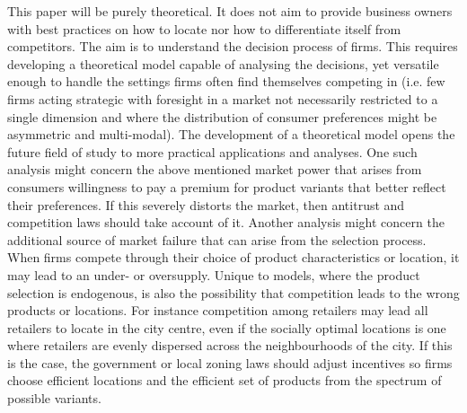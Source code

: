 \documentclass[preprint, 12pt]{elsarticle}
\begin{document}
This paper will be purely theoretical. It does not aim to provide business owners with best practices on how to locate nor how to differentiate itself from competitors. The aim is to understand the decision process of firms. This requires developing a theoretical model capable of analysing the decisions, yet versatile enough to handle the settings firms often find themselves competing in (i.e. few firms acting strategic with foresight in a market not necessarily restricted to a single dimension and where the distribution of consumer preferences might be asymmetric and multi-modal). The development of a theoretical model opens the future field of study to more practical applications and analyses. One such analysis might concern the above mentioned market power that arises from consumers willingness to pay a premium for product variants that better reflect their preferences. If this severely distorts the market, then antitrust and competition laws should take account of it. Another analysis might concern the additional source of market failure that can arise from the selection process. When firms compete through their choice of product characteristics or location, it may lead to an under- or oversupply. Unique to models, where the product selection is endogenous, is also the possibility that competition leads to the wrong products or locations. For instance competition among retailers may lead all retailers to locate in the city centre, even if the socially optimal locations is one where retailers are evenly dispersed across the neighbourhoods of the city. If this is the case, the government or local zoning laws should adjust incentives so firms choose efficient locations and the efficient set of products from the spectrum of possible variants.
\end{document}
